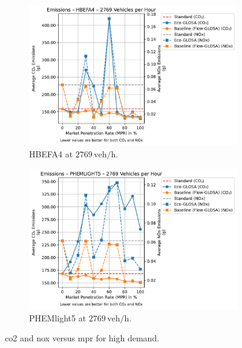 \begin{figure}[htb]
  \centering
  \begin{subfigure}[b]{0.45\textwidth}
    \includegraphics[width=\textwidth]{data/img/Emissions/Emissions_HBEFA4_Cars2769.pdf}
    \caption{HBEFA4 at $2769\,\mathrm{veh/h}$.}
    \label{fig:Emis_2769_HBEFA4}
  \end{subfigure}\hfill
  \begin{subfigure}[b]{0.45\textwidth}
    \includegraphics[width=\textwidth]{data/img/Emissions/Emissions_PHEMLIGHT5_Cars2769.pdf}
    \caption{PHEMlight5 at $2769\,\mathrm{veh/h}$.}
    \label{fig:Emis_2769_PHEM}
  \end{subfigure}
  \caption{\ac{co2} and \ac{nox} versus \ac{mpr} for high demand.}
  \label{fig:Emis_2769}
\end{figure}

